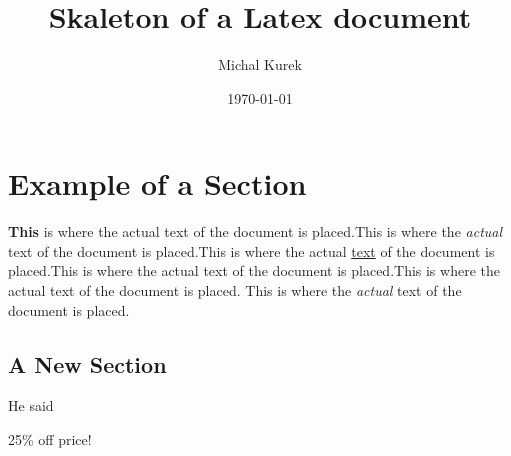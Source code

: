 \documentclass{article}
\title{Skaleton of a Latex document}
\author{Michal Kurek}
\date{\today}
\begin{document}
\maketitle

\tableofcontents

\section{Example of a Section}
\textbf{This} is where the actual text of the document is placed.This is where the \textit{actual} text of the document is placed.This is where the actual \underline{text} of the document is placed.This is 
where the actual text of the document is placed.This is where the actual text of the document is placed.\newline 
This is where the \textit{actual} text of the document is placed.

\subsection{A New Section}
He said 

25\% off price!

\begin{comment}
    \blindtext
\end{comment}

\blindtext
\end{document}
